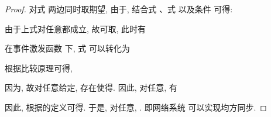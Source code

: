 \begin{proof}
        对式  两边同时取期望, 由于, 结合式 、式  以及条件  可得:
        \begin{comment}\label{EdVt}
        \nonumber \frac{d\mathrm{E}V(t)}{dt}\leq&-\pi_u\xi e^\top(t)[I_u\otimes Q]e(t)+\frac{1}{2}(\bar{\lambda}^2+2\epsilon)\pi_uc\bar{q}^2\bar{\gamma}^2\mu e^\top(t)e(t)\\
        \nonumber&+(1+\epsilon)\pi_uc\frac{1}{2\mu}\delta^\top(t)\delta(t)+\pi_u\epsilon c\frac{1}{2\mu}\hat{s}^\top(t)\hat{s}(t)+\frac{1}{2}\pi_uc^2Nqh(t)\\
        \nonumber\leq&-\xi \mathrm{E}V(t)+\frac{1}{2}\pi_uc^2Nqh(t)+\frac{\pi_u}{2}[-\xi\underline{q}+(\bar{\lambda}^2
        +2\epsilon)c\bar{q}^2\bar{\gamma}^2\mu]e^\top(t)e(t)\\
        &+\frac{\pi_u}{2\mu}c[(1+\epsilon)\delta^\top(t)\delta(t)+\epsilon\hat{s}^\top(t)\hat{s}(t)].
        \end{comment}
        由于上式对任意都成立, 故可取, 此时有
        \begin{comment}
        -\xi\underline{q}+(\bar{\lambda}^2+2\epsilon)c\bar{q}^2\bar{\gamma}^2\mu
        =-\frac{c}{\mu}\frac{\xi^2\underline{q}^2}{4(\bar{\lambda}^2+2\epsilon)c^2\bar{q}^2\bar{\gamma}^2}.
        \end{comment}
        在事件激发函数  下, 式  可以转化为
        \begin{comment}
        \frac{d\mathrm{E}V(t)}{dt}\leq-\xi \mathrm{E}V(t)+\frac{1}{2}\pi_uc^2Nqh(t).
        \end{comment}
        根据比较原理可得,
        \begin{comment}
        \mathrm{E}V(t)\leq V(0)e^{-\xi t}+\frac{1}{2}\pi_uc^2Nq\int_0^th(s)e^{-\xi(t-s)}ds.
        \end{comment}

        因为, 故对任意给定, 存在使得. 因此, 对任意, 有
        \begin{comment}
        \nonumber\int_0^th(s)e^{-\xi(t-s)}ds&=\int_0^\delta h(s)e^{-\xi(t-s)}ds+\int_\delta^th(s)e^{-\xi(t-s)}ds\\
        \nonumber&\leq e^{-\xi(t-\delta)}\int_0^\delta h(s)ds+\int_\delta^th(s)ds\\
        \nonumber&\leq e^{-\xi(t-\delta)}\int_0^\infty h(s)ds+\int_\delta^\infty h(s)ds\\
        &\leq e^{-\xi(t-\delta)}\int_0^\infty h(s)ds+\eta.
        \end{comment}
        因此, 根据的定义可得. 于是, 对任意, . 即网络系统  可以实现均方同步.
        \end{proof}

